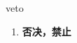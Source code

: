
\begin{frame}
{\huge veto}
\begin{center}
\begin{enumerate}\Large
  \item \textbf{否决，禁止}
\end{enumerate}
\end{center}
\end{frame}
